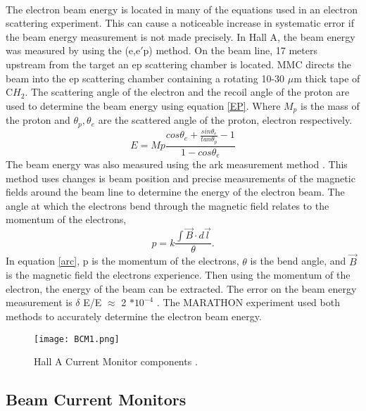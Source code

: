 	 \paragraph{}The electron beam energy is located in many of the equations used in an electron scattering experiment. This can cause a noticeable increase in systematic error if the beam energy measurement is not made precisely. In Hall A, the beam energy was measured by using the (e,e$\prime$p) method. On the beam line, 17 meters upstream from the target an ep scattering chamber is located. MMC directs the beam into the ep scattering chamber containing a rotating 10-30 $\mu$m thick tape of C$H_2$. The scattering angle of the electron and the recoil angle of the proton are used to determine the beam energy using equation \ref{EP}. Where $M_p$ is the mass of the proton and $\theta_p, \theta_e$ are the scattered angle of the proton, electron respectively. 
	\begin{equation}
	\label{EP}
	E = Mp \frac{cos\theta_e + \frac{sin\theta_e}{tan\theta_p}-1}{1 - cos\theta_e} 
	\end{equation}
	The beam energy was also measured using the ark measurement method \cite{Flay}. This method uses changes is beam position and precise measurements of the magnetic fields around the beam line to determine the energy of the electron beam. The angle at which the electrons bend through the magnetic field relates to the momentum of the electrons,
	\begin{equation}
	\label{arc}
	p = k \frac{\int \vec{B} \cdot d\vec{l}}{\theta}.
	\end{equation}	
	In equation \ref{arc}, p is the momentum of the electrons, $\theta$ is the bend angle, and $\vec{B}$ is the magnetic field the electrons experience. Then using the momentum of the electron, the energy of the beam can be extracted. The error on the beam energy measurement is $\delta$ E/E $\approx$ 2 $* 10^{-4} $ \cite{EPMet, Flay}.  The MARATHON experiment used both methods to accurately determine the electron beam energy.
	
		  	\begin{figure}[t]
		  	 	 		\centering
		  	 	 		\caption{Hall A Current Monitor components \cite{BCM1}. 
		  	 	 		\label{BCMpng}}
		  	 	 		\texttt{[image: BCM1.png]} 
		  	\end{figure}
	\subsection{Beam Current Monitors}
